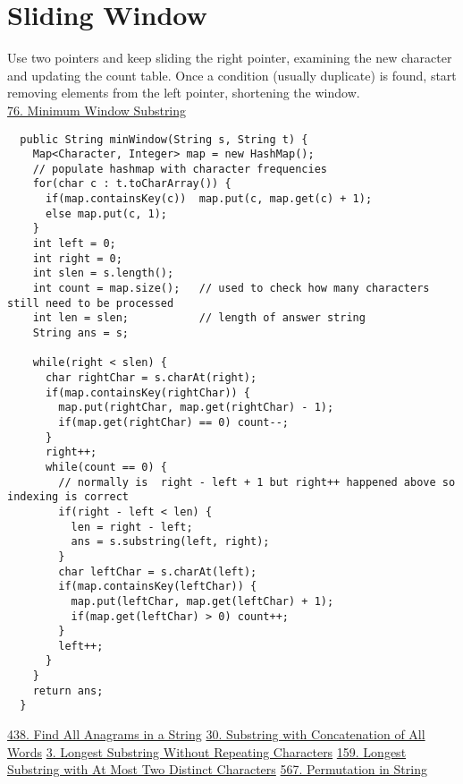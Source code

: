 \documentclass{article}
\begin{document}
  \section{Sliding Window}
  Use two pointers and keep sliding the right pointer, examining the new character and updating the count table. Once a condition (usually duplicate) is found, start removing elements from the left pointer, shortening the window.\\
  \href{https://leetcode.com/problems/minimum-window-substring/description/}{76. Minimum Window Substring}
  \begin{lstlisting}
  public String minWindow(String s, String t) {
    Map<Character, Integer> map = new HashMap();
    // populate hashmap with character frequencies
    for(char c : t.toCharArray()) {
      if(map.containsKey(c))  map.put(c, map.get(c) + 1);
      else map.put(c, 1);
    }
    int left = 0;
    int right = 0;
    int slen = s.length();
    int count = map.size();   // used to check how many characters still need to be processed
    int len = slen;           // length of answer string
    String ans = s;

    while(right < slen) {
      char rightChar = s.charAt(right);
      if(map.containsKey(rightChar)) {
        map.put(rightChar, map.get(rightChar) - 1);
        if(map.get(rightChar) == 0) count--;
      }
      right++;
      while(count == 0) {
        // normally is  right - left + 1 but right++ happened above so indexing is correct
        if(right - left < len) {
          len = right - left;
          ans = s.substring(left, right);
        }
        char leftChar = s.charAt(left);
        if(map.containsKey(leftChar)) {
          map.put(leftChar, map.get(leftChar) + 1);
          if(map.get(leftChar) > 0) count++;
        }
        left++;
      }
    }
    return ans;
  }
  \end{lstlisting}
  \href{https://leetcode.com/problems/find-all-anagrams-in-a-string/description/}{438. Find All Anagrams in a String} \quad \href{https://leetcode.com/problems/substring-with-concatenation-of-all-words/description/}{30. Substring with Concatenation of All Words} \quad \href{https://leetcode.com/problems/longest-substring-without-repeating-characters/}{3. Longest Substring Without Repeating Characters} \quad \href{https://leetcode.com/problems/longest-substring-with-at-most-two-distinct-characters/}{159. Longest Substring with At Most Two Distinct Characters} \quad \href{https://leetcode.com/problems/permutation-in-string/description/}{567. Permutation in String}
\end{document}
